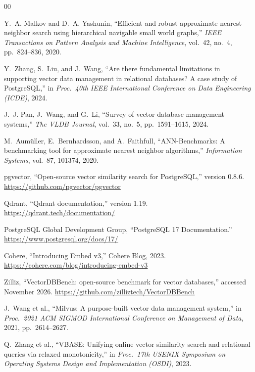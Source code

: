 \documentclass[sigconf, nonacm]{acmart}
\begin{document}
\begin{thebibliography}{00}

Y.~A. Malkov and D.~A. Yashunin, ``Efficient and robust approximate nearest
neighbor search using hierarchical navigable small world graphs,''
\textit{IEEE Transactions on Pattern Analysis and Machine Intelligence},
vol.~42, no.~4, pp.~824--836, 2020.

Y.~Zhang, S.~Liu, and J.~Wang, ``Are there fundamental limitations in supporting
vector data management in relational databases? A case study of PostgreSQL,'' in
\textit{Proc.\ 40th IEEE International Conference on Data Engineering (ICDE)}, 2024.

J.~J. Pan, J.~Wang, and G.~Li, ``Survey of vector database management systems,''
\textit{The VLDB Journal}, vol.~33, no.~5, pp.~1591--1615, 2024.

M.~Aumüller, E.~Bernhardsson, and A.~Faithfull, ``ANN-Benchmarks: A benchmarking tool
for approximate nearest neighbor algorithms,'' \textit{Information Systems}, vol.~87,
101374, 2020.

pgvector, ``Open-source vector similarity search for PostgreSQL,'' version 0.8.6.
\url{https://github.com/pgvector/pgvector}

Qdrant, ``Qdrant documentation,'' version 1.19. \url{https://qdrant.tech/documentation/}

PostgreSQL Global Development Group, ``PostgreSQL 17 Documentation.''
\url{https://www.postgresql.org/docs/17/}

Cohere, ``Introducing Embed v3,'' Cohere Blog, 2023.
\url{https://cohere.com/blog/introducing-embed-v3}

Zilliz, ``VectorDBBench: open-source benchmark for vector databases,'' accessed
November 2026. \url{https://github.com/zilliztech/VectorDBBench}

J.~Wang et al., ``Milvus: A purpose-built vector data management system,'' in
\textit{Proc.\ 2021 ACM SIGMOD International Conference on Management of Data}, 2021,
pp.~2614--2627.

Q.~Zhang et al., ``VBASE: Unifying online vector similarity search and relational queries
via relaxed monotonicity,'' in \textit{Proc.\ 17th USENIX Symposium on Operating Systems
Design and Implementation (OSDI)}, 2023.


\end{thebibliography}
\end{document}
